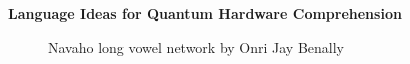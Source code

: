 \begin{center}
\Large\textbf{Language Ideas for Quantum Hardware Comprehension}
\end{center}

\large{
\begin{figure}[htbp]
    \centering
    
    \caption{Navaho long vowel network by Onri Jay Benally}
    \label{fig:svgImage}
\end{figure}
}
